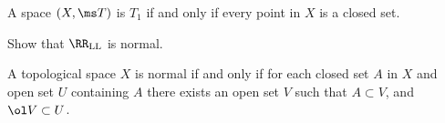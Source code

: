 \documentclass{fkpset}
\begin{document}
  \begin{problem}[5.1]
    A space $(X, \ms T)$ is $T_1$ if and only if every point in $X$ is
    a closed set.
  \end{problem}
  \begin{solution}

  \end{solution}
  \clearpage

  \begin{problem}[5.5]
    Show that $\RR_{\rm LL}$ is normal.
  \end{problem}
  \begin{solution}

  \end{solution}
  \clearpage

  \begin{problem}[5.9]
    A topological space $X$ is normal if and only if for each closed
    set $A$ in $X$ and open set $U$ containing $A$ there exists an
    open set $V$ such that $A \subset V$, and $\ol V \subset U$.
  \end{problem}
  \begin{solution}

  \end{solution}
\end{document}
